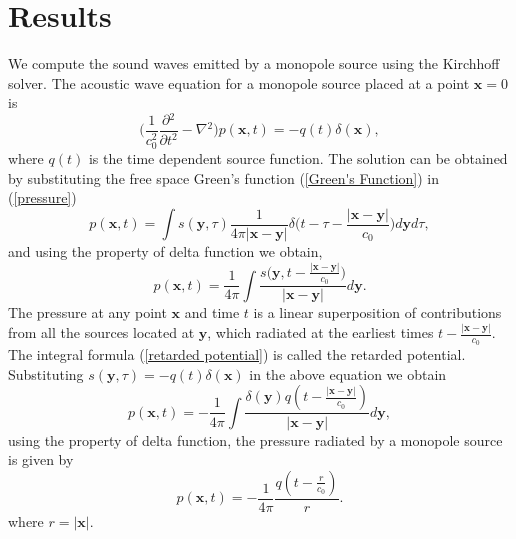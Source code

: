 \documentclass[a4paper]{article}
\begin{document}
\section{Results}
We compute the sound waves emitted by a monopole source using the Kirchhoff solver. The acoustic wave equation for a monopole source placed at a point $\mathbf{x} = 0$ is
\begin{equation}
	\Bigg( \frac{1}{c_{0}^2}\frac{\partial{}^{2}}{\partial{t}^{2}}- \nabla{}^{2} \Bigg) p(\mathbf{x}, t)  = -q(t)\delta(\mathbf{x}), 
\end{equation}
where $q(t)$ is the time dependent source function. The solution can be obtained by substituting the free space Green's function (\ref{Green's Function}) in (\ref{pressure})
\begin{equation}
	p(\mathbf{x}, t) = \int s(\mathbf{y}, \tau) \frac{1}{4\pi|\mathbf{x} - \mathbf{y}|}\delta \Bigg(t - \tau - \frac{|\mathbf{x} - \mathbf{y}|}{c_{0}}\Bigg)d\mathbf{y}d\tau, 
\end{equation}
and using the property of delta function we obtain,
\begin{equation}\label{retarded potential}
	p(\mathbf{x}, t) = \frac{1}{4\pi}\int \frac{s\Big(\mathbf{y}, t - \frac{|\mathbf{x} - \mathbf{y}|}{c_{0}}\Big)}{|\mathbf{x} - \mathbf{y}|}d\mathbf{y}. 
\end{equation}
The pressure at any point $\mathbf{x}$ and time $t$ is a linear superposition of contributions from all the sources located at $\mathbf{y}$, which radiated at the earliest times $t - \frac{|\mathbf{x} - \mathbf{y}|}{c_{0}}$. The integral formula (\ref{retarded potential}) is called the retarded potential. Substituting $s(\mathbf{y}, \tau) = -q(t)\delta(\mathbf{x})$ in the above equation we obtain
\begin{equation}
	p(\mathbf{x}, t) = -\frac{1}{4\pi}\int \frac{ \delta (\mathbf{y}) q(t - \frac{|\mathbf{x} - \mathbf{y}|}{c_{0}}) }{{|\mathbf{x} - \mathbf{y}|}}d\mathbf{y},
\end{equation}
using the property of delta function, the pressure radiated by a monopole source is given by
\begin{equation}
	p(\mathbf{x}, t) = -\frac{1}{4\pi} \frac{  q(t - \frac{r}{c_{0}}) }{r}. 
\end{equation}
where $r = {|\mathbf{x}|}$.
\end{document}
